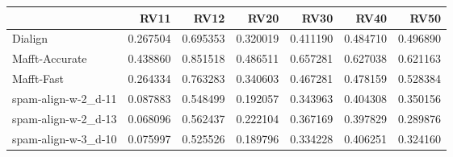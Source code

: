 \begin{tabular}{lrrrrrr}
\toprule
{} &      RV11 &      RV12 &      RV20 &      RV30 &      RV40 &      RV50 \\
\midrule
Dialign             &  0.267504 &  0.695353 &  0.320019 &  0.411190 &  0.484710 &  0.496890 \\
Mafft-Accurate      &  0.438860 &  0.851518 &  0.486511 &  0.657281 &  0.627038 &  0.621163 \\
Mafft-Fast          &  0.264334 &  0.763283 &  0.340603 &  0.467281 &  0.478159 &  0.528384 \\
spam-align-w-2\_d-11 &  0.087883 &  0.548499 &  0.192057 &  0.343963 &  0.404308 &  0.350156 \\
spam-align-w-2\_d-13 &  0.068096 &  0.562437 &  0.222104 &  0.367169 &  0.397829 &  0.289876 \\
spam-align-w-3\_d-10 &  0.075997 &  0.525526 &  0.189796 &  0.334228 &  0.406251 &  0.324160 \\
\bottomrule
\end{tabular}
